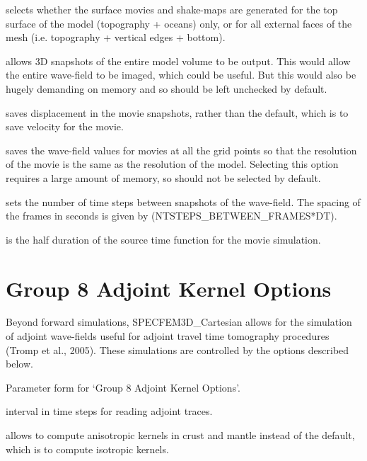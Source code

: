 \documentclass[english]{book}
\begin{document}
 selects whether the surface movies and shake-maps are
generated for the top surface of the model (topography + oceans) only,
or for all external faces of the mesh (i.e. topography + vertical edges
+ bottom).

 allows 3D snapshots of the entire model volume to be
output. This would allow the entire wave-field to be imaged, which could
be useful. But this would also be hugely demanding on memory and so
should be left unchecked by default.

 saves displacement in the movie snapshots, rather
than the default, which is to save velocity for the movie.

 saves the wave-field values for movies at
all the grid points so that the resolution of the movie is the same as
the resolution of the model. Selecting this option requires a large
amount of memory, so should not be selected by default.

 sets the number of time steps between
snapshots of the wave-field. The spacing of the frames in seconds is
given by (NTSTEPS\_BETWEEN\_FRAMES*DT).

 is the half duration of the source time function for the
movie simulation.


\section{Group 8 \textendash{} Adjoint Kernel Options}
\label{\detokenize{Appendix1:a1-9-group-8-adjoint-kernel-options}}
Beyond forward simulations, SPECFEM3D\_Cartesian allows for the
simulation of adjoint wave-fields useful for adjoint travel time
tomography procedures (Tromp et al., 2005). These simulations are
controlled by the options described below.


 Parameter form for ‘Group 8 \textendash{} Adjoint Kernel
Options’.

 interval in time steps for reading
adjoint traces.

 allows to compute anisotropic kernels in crust and
mantle instead of the default, which is to compute isotropic kernels.
\end{document}
